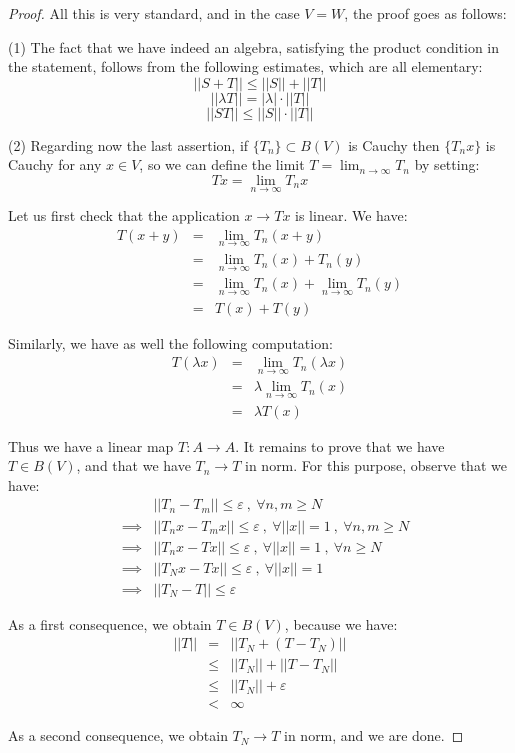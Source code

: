 \documentclass[12pt]{amsbook}
\begin{document}
\begin{proof}
All this is very standard, and in the case $V=W$, the proof goes as follows:

\medskip

(1) The fact that we have indeed an algebra, satisfying the product condition in the statement, follows from the following estimates, which are all elementary:
$$||S+T||\leq||S||+||T||$$
$$||\lambda T||=|\lambda|\cdot||T||$$
$$||ST||\leq||S||\cdot||T||$$

(2) Regarding now the last assertion, if $\{T_n\}\subset B(V)$ is Cauchy then $\{T_nx\}$ is Cauchy for any $x\in V$, so we can define the limit $T=\lim_{n\to\infty}T_n$ by setting:
$$Tx=\lim_{n\to\infty}T_nx$$

Let us first check that the application $x\to Tx$ is linear. We have:
\begin{eqnarray*}
T(x+y)
&=&\lim_{n\to\infty}T_n(x+y)\\
&=&\lim_{n\to\infty}T_n(x)+T_n(y)\\
&=&\lim_{n\to\infty}T_n(x)+\lim_{n\to\infty}T_n(y)\\
&=&T(x)+T(y)
\end{eqnarray*}

Similarly, we have as well the following computation:
\begin{eqnarray*}
T(\lambda x)
&=&\lim_{n\to\infty}T_n(\lambda x)\\
&=&\lambda\lim_{n\to\infty}T_n(x)\\
&=&\lambda T(x)
\end{eqnarray*}

Thus we have a linear map $T:A\to A$. It remains to prove that we have $T\in B(V)$, and that we have $T_n\to T$ in norm. For this purpose, observe that we have:
\begin{eqnarray*}
&&||T_n-T_m||\leq\varepsilon\ ,\ \forall n,m\geq N\\
&\implies&||T_nx-T_mx||\leq\varepsilon\ ,\ \forall||x||=1\ ,\ \forall n,m\geq N\\
&\implies&||T_nx-Tx||\leq\varepsilon\ ,\ \forall||x||=1\ ,\ \forall n\geq N\\
&\implies&||T_Nx-Tx||\leq\varepsilon\ ,\ \forall||x||=1\\
&\implies&||T_N-T||\leq\varepsilon
\end{eqnarray*}

As a first consequence, we obtain $T\in B(V)$, because we have:
\begin{eqnarray*}
||T||
&=&||T_N+(T-T_N)||\\
&\leq&||T_N||+||T-T_N||\\
&\leq&||T_N||+\varepsilon\\
&<&\infty
\end{eqnarray*}

As a second consequence, we obtain $T_N\to T$ in norm, and we are done.
\end{proof}
\end{document}
